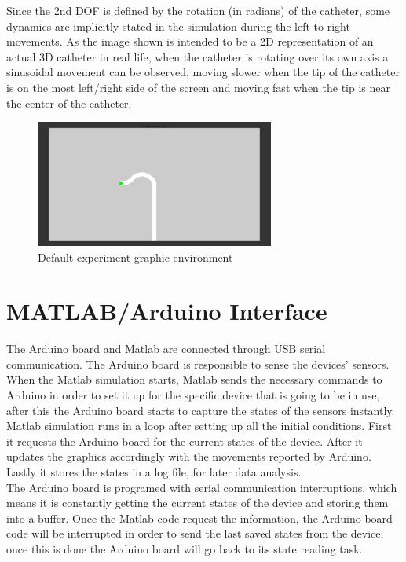 Since the 2nd DOF is defined by the rotation (in radians) of the catheter, some dynamics are implicitly stated in the simulation during the left to right movements. As the image shown is intended to be a 2D representation of an actual 3D catheter in real life, when the catheter is rotating over its own axis a sinusoidal movement can be observed, moving slower when the tip of the catheter is on the most left/right side of the screen and moving fast when the tip is near the center of the catheter.\\

\begin{figure}[ht]
   \centering
   \includegraphics[width=0.7\textwidth]{img/graph.PNG}
   \caption{Default experiment graphic environment}
   \label{img:graph}
\end{figure}

\section{MATLAB/Arduino Interface}\label{sec:matardinter}
The Arduino board and Matlab are connected through USB serial communication. The Arduino board is responsible to sense the devices' sensors. When the Matlab simulation starts, Matlab sends the necessary commands to Arduino in order to set it up for the specific device that is going to be in use, after this the Arduino board starts to capture the states of the sensors instantly.\\

Matlab simulation runs in a loop after setting up all the initial conditions. First it requests the Arduino board for the current states of the device. After it updates the graphics accordingly with the movements reported by Arduino. Lastly it stores the states in a log file, for later data analysis.\\

The Arduino board is programed with serial communication interruptions, which means it is constantly getting the current states of the device and storing them into a buffer. Once the Matlab code request the information, the Arduino board code will be interrupted in order to send the last saved states from the device; once this is done the Arduino board will go back to its state reading task.\\

